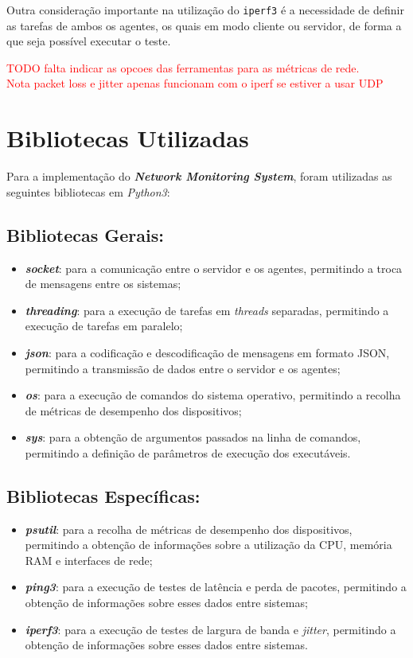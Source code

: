 \documentclass[a4paper,12pt]{scrreprt}
\begin{document}
Outra consideração importante na utilização do \texttt{iperf3} é a necessidade de
definir as tarefas de ambos os agentes, os quais em modo cliente ou servidor,
de forma a que seja possível executar o teste.

\textcolor{red}{
    TODO falta indicar as opcoes das ferramentas para as métricas de rede. \\
    Nota packet loss e jitter apenas funcionam com o iperf se estiver a usar UDP
}

\section{Bibliotecas Utilizadas}

Para a implementação do \textbf{\textit{Network Monitoring System}}, foram utilizadas
as seguintes bibliotecas em \textit{Python3}:

\subsection{Bibliotecas Gerais:}
\begin{itemize}
    \item \textbf{\textit{socket}}: para a comunicação entre o servidor e os agentes,
    permitindo a troca de mensagens entre os sistemas;
    \item \textbf{\textit{threading}}: para a execução de tarefas em \textit{threads} separadas,
    permitindo a execução de tarefas em paralelo;
    \item \textbf{\textit{json}}: para a codificação e descodificação de mensagens em formato JSON,
    permitindo a transmissão de dados entre o servidor e os agentes;
    \item \textbf{\textit{os}}: para a execução de comandos do sistema operativo, permitindo a
    recolha de métricas de desempenho dos dispositivos;
    \item \textbf{\textit{sys}}: para a obtenção de argumentos passados na linha de comandos,
    permitindo a definição de parâmetros de execução dos executáveis.
\end{itemize}

\subsection{Bibliotecas Específicas:}
\begin{itemize}
    \item \textbf{\textit{psutil}}: para a recolha de métricas de desempenho dos dispositivos,
    permitindo a obtenção de informações sobre a utilização da CPU, memória RAM e interfaces de rede;
    \item \textbf{\textit{ping3}}: para a execução de testes de latência e perda de pacotes,
    permitindo a obtenção de informações sobre esses dados entre sistemas;
    \item \textbf{\textit{iperf3}}: para a execução de testes de largura de banda e \textit{jitter},
    permitindo a obtenção de informações sobre esses dados entre sistemas.
\end{itemize}
\end{document}
